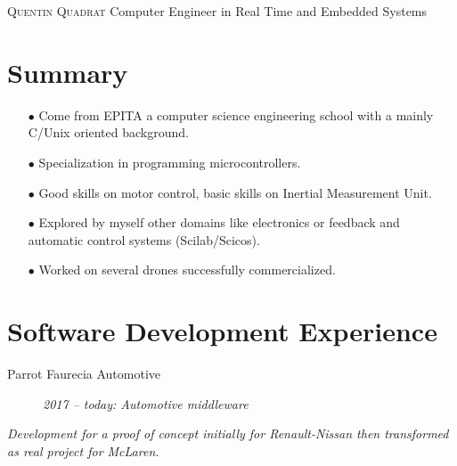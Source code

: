 \documentclass{crcv}
\newcommand{\desc}[4]{
\begin{description}
\item[\textcolor{fortitle}{#1}]\hspace*{\fill}\textit{\textcolor{fortitle}{#2 -- #3: #4}}\\
\end{description}
}
\begin{document}
\begin{center}{\Huge \textsc{Quentin \textcolor{fortitle}{Quadrat}} \large Computer Engineer in Real Time and Embedded Systems}\vspace{2mm}\end{center}

\MakeEntete


\section{\textcolor{fortitle}{Sum}mary}

\begin{itemize}
\item[$\bullet$] Come from EPITA a computer science engineering school with a mainly
  C/Unix oriented background.
\item[$\bullet$] Specialization in programming microcontrollers.
\item[$\bullet$] Good skills on motor control, basic skills on Inertial Measurement Unit.
\item[$\bullet$] Explored by myself other domains like electronics or
  feedback and automatic control systems (Scilab/Scicos).
\item[$\bullet$] Worked on several drones successfully commercialized.
\end{itemize}

\section{\textcolor{fortitle}{Soft}ware Development Experience}

\desc{Parrot Faurecia Automotive}{2017}{today}{Automotive middleware}

\textit{Development for a proof of concept initially for
Renault-Nissan then transformed as real project for McLaren.}
\end{document}
